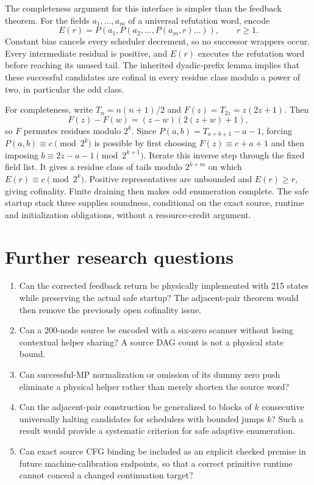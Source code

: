 \documentclass[11pt]{article}
\begin{document}
The completeness argument for this interface is simpler than the feedback theorem. For the fields $a_1,\ldots,a_m$ of a universal refutation word, encode
\[
 E(r)=P(a_1,P(a_2,\ldots,P(a_m,r)\ldots)),\qquad r\ge1.
\]
Constant bias cancels every scheduler decrement, so no successor wrappers occur. Every intermediate residual is positive, and $E(r)$ executes the refutation word before reaching its unused tail. The inherited dyadic-prefix lemma implies that these successful candidates are cofinal in every residue class modulo a power of two, in particular the odd class.

For completeness, write $T_n=n(n+1)/2$ and $F(z)=T_{2z}=z(2z+1)$. Then
\[
 F(z)-F(w)=(z-w)(2(z+w)+1),
\]
so $F$ permutes residues modulo $2^k$. Since $P(a,b)=T_{a+b+1}-a-1$, forcing $P(a,b)\equiv c\pmod{2^k}$ is possible by first choosing $F(z)\equiv c+a+1$ and then imposing $b\equiv2z-a-1\pmod{2^{k+1}}$. Iterate this inverse step through the fixed field list. It gives a residue class of tails modulo $2^{k+m}$ on which $E(r)\equiv c\pmod{2^k}$. Positive representatives are unbounded and $E(r)\ge r$, giving cofinality. Finite draining then makes odd enumeration complete. The safe startup stack three supplies soundness, conditional on the exact source, runtime and initialization obligations, without a resource-credit argument.

\section{Further research questions}
\begin{enumerate}
\item Can the corrected feedback return be physically implemented with 215 states while preserving the actual safe startup? The adjacent-pair theorem would then remove the previously open cofinality issue.
\item Can a 200-node source be encoded with a six-zero scanner without losing contextual helper sharing? A source DAG count is not a physical state bound.
\item Can successful-MP normalization or omission of its dummy zero push eliminate a physical helper rather than merely shorten the source word?
\item Can the adjacent-pair construction be generalized to blocks of $k$ consecutive universally halting candidates for schedulers with bounded jumps $k$? Such a result would provide a systematic criterion for safe adaptive enumeration.
\item Can exact source CFG binding be included as an explicit checked premise in future machine-calibration endpoints, so that a correct primitive runtime cannot conceal a changed continuation target?
\end{enumerate}
\end{document}
